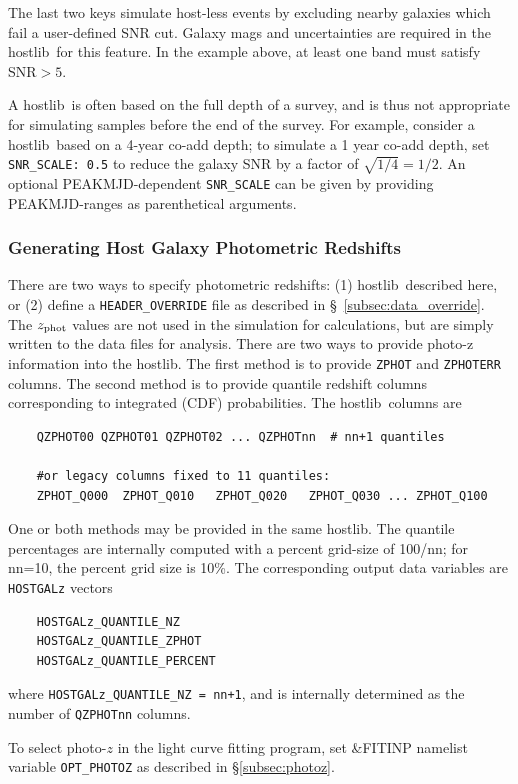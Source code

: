 \documentclass[12pt]{article}
\newcommand{\hostlib}{{\sc hostlib}}
\newcommand{\Zphot}{z_{\rm phot}}
\begin{document}
{The last two keys simulate host-less events by excluding nearby galaxies
which fail a user-defined SNR cut.
Galaxy mags and uncertainties are required in the
\hostlib\ for this feature. 
In the example above, at least one band must satisfy SNR$>5$.

A \hostlib\ is often based on the full depth of a survey,
and is thus not appropriate for simulating samples before
the end of the survey.
For example, consider a \hostlib\ based on a 4-year co-add depth;
to simulate a 1 year co-add depth, set {\tt SNR\_SCALE: 0.5}
to reduce the galaxy SNR by a factor of $\sqrt{1/4}=1/2$.
An optional PEAKMJD-dependent {\tt SNR\_SCALE} can be given
by providing PEAKMJD-ranges as parenthetical arguments.

\subsubsection{Generating Host Galaxy Photometric Redshifts}
\label{sss:quantiles}

There are two ways to specify photometric redshifts:
(1) \hostlib\ described here, or (2) define a \verb|HEADER_OVERRIDE| file 
as described in \S~\ref{subsec:data_override}.
The $\Zphot$ values are not used in the simulation for calculations,
but are simply written to the data files for analysis.
There are two ways to provide photo-z information into the \hostlib.
The first method is to provide {\tt ZPHOT} and {\tt ZPHOTERR} columns.
The second method is to provide quantile redshift columns 
corresponding to integrated (CDF) probabilities. The \hostlib\ columns are
\begin{verbatim}
    QZPHOT00 QZPHOT01 QZPHOT02 ... QZPHOTnn  # nn+1 quantiles

    #or legacy columns fixed to 11 quantiles:
    ZPHOT_Q000  ZPHOT_Q010   ZPHOT_Q020   ZPHOT_Q030 ... ZPHOT_Q100
\end{verbatim}
One or both methods may be provided in the same \hostlib.
The quantile percentages are internally computed with a percent grid-size 
of 100/nn; for nn=10, the percent grid size is 10\%.
The corresponding output data variables are {\tt HOSTGALz} vectors
%
\begin{verbatim} 
    HOSTGALz_QUANTILE_NZ
    HOSTGALz_QUANTILE_ZPHOT
    HOSTGALz_QUANTILE_PERCENT
\end{verbatim}
%
where \verb|HOSTGALz_QUANTILE_NZ = nn+1|, and is internally determined as the
number of {\tt QZPHOTnn} columns.

To select photo-$z$ in the light curve fitting program,
set {\&FITINP} namelist variable \verb|OPT_PHOTOZ|
as described in \S\ref{subsec:photoz}. 

}
\end{document}
